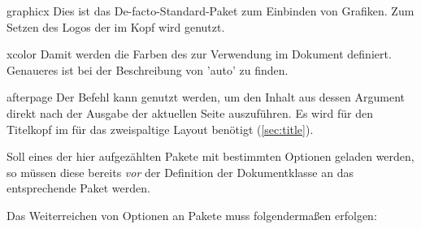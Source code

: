 \begin{packages}
\item[graphicx]
  Dies ist das De-facto-Standard-Paket zum Einbinden von Grafiken. Zum Setzen 
  des Logos der \TnUD im Kopf wird  genutzt.
\item[xcolor]
  Damit werden die Farben des \CDs zur Verwendung im Dokument definiert. 
  Genaueres ist bei der Beschreibung von 'auto' zu finden.
\item[afterpage]
  Der Befehl \Parameter{\dots} kann genutzt werden, um den 
  Inhalt aus dessen Argument direkt nach der Ausgabe der aktuellen Seite 
  auszuführen. Es wird für den Titelkopf im \CD für das zweispaltige Layout 
  benötigt (\autoref{sec:title}).
\end{packages}
%
Soll eines der hier aufgezählten Pakete mit bestimmten Optionen geladen werden, 
so müssen diese bereits \emph{vor} der Definition der Dokumentklasse an das 
entsprechende Paket werden.
%
\begin{Example}
Das Weiterreichen von Optionen an Pakete muss folgendermaßen erfolgen:
\end{Example}\vspace{-\baselineskip}%



